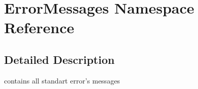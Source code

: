 \hypertarget{namespaceErrorMessages}{
\section{ErrorMessages Namespace Reference}
\label{namespaceErrorMessages}
}


\subsection{Detailed Description}
contains all standart error's messages 